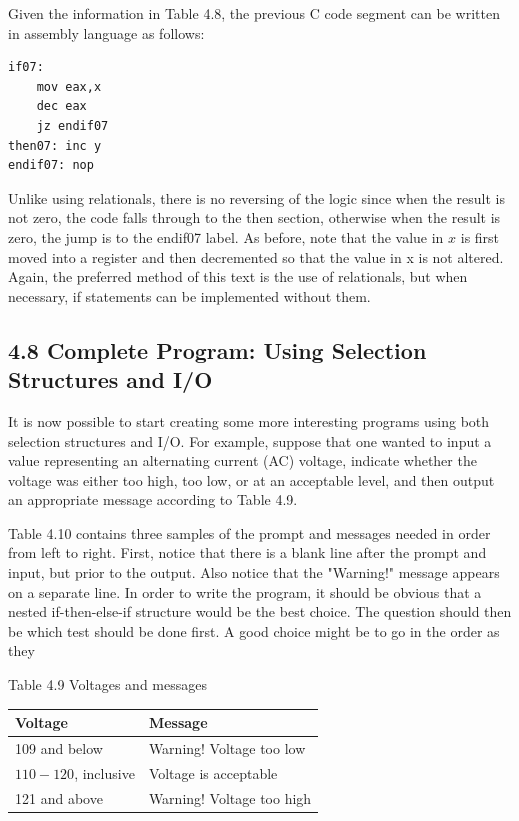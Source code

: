 \documentclass[10pt]{article}
\begin{document}
Given the information in Table 4.8, the previous C code segment can be written in assembly language as follows:

\begin{verbatim}
if07:
    mov eax,x
    dec eax
    jz endif07
then07: inc y
endif07: nop
\end{verbatim}

Unlike using relationals, there is no reversing of the logic since when the result is not zero, the code falls through to the then section, otherwise when the result is zero, the jump is to the endif07 label. As before, note that the value in $x$ is first moved into a register and then decremented so that the value in x is not altered. Again, the preferred method of this text is the use of relationals, but when necessary, if statements can be implemented without them.

\subsection*{4.8 Complete Program: Using Selection Structures and I/O}
It is now possible to start creating some more interesting programs using both selection structures and I/O. For example, suppose that one wanted to input a value representing an alternating current (AC) voltage, indicate whether the voltage was either too high, too low, or at an acceptable level, and then output an appropriate message according to Table 4.9.

Table 4.10 contains three samples of the prompt and messages needed in order from left to right. First, notice that there is a blank line after the prompt and input, but prior to the output. Also notice that the "Warning!" message appears on a separate line. In order to write the program, it should be obvious that a nested if-then-else-if structure would be the best choice. The question should then be which test should be done first. A good choice might be to go in the order as they

Table 4.9 Voltages and messages

\begin{center}
\begin{tabular}{|l|l|}
\hline
Voltage & Message \\
\hline
109 and below & Warning! Voltage too low \\
\hline
$110-120$, inclusive & Voltage is acceptable \\
\hline
121 and above & Warning! Voltage too high \\
\hline
\end{tabular}
\end{center}
\end{document}
